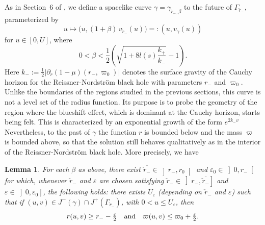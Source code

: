 \documentclass[a4paper,11pt,oneside,reqno]{amsart}
\newcommand{\kk}{k_+}
\newcommand{\kkk}{k_-}
\newtheorem{Lem}[Thm]{Lemma}
\newcommand{\eps}{\varepsilon}
\newcommand{\ckrm}{\check r_-}
\newcommand{\cg}{\Gamma}
\newcommand{\vgr}{v_{\ckrm}}
\newcommand{\gam}{\gamma}
\begin{document}
As in Section~6 of \cite{relIst2}, we define a spacelike curve $\gamma=\gamma_{\ckrm,\beta}$ to the future of
$\Gamma_{\ckrm}$, parameterized by
\begin{equation}\label{small_gamma}
u\mapsto\big(u,(1+\beta)\,\vgr(u))=:(u,v_\gamma(u))
\end{equation}
for $u\in[0,U]$, where
\begin{equation}\label{beta_ii} 
0<\beta<{\textstyle\frac 12\left(\sqrt{1+8l(s)\frac{\kk}{\kkk}}-1\right)}.
\end{equation}
Here $k_- := \frac12 \left|\partial_r(1-\mu)(r_-,\varpi_0)\right|$ denotes the surface gravity of the Cauchy horizon for the Reissner-Nordstr\"{o}m black hole with parameters $r_-$ and $\varpi_0$.
Unlike the boundaries of the regions studied in the previous sections, this curve is not a level set of the radius function. Its purpose is to probe the geometry of the region where the blueshift effect, which is dominant at the Cauchy horizon, starts being felt. This is characterized by an exponential growth of the form $e^{2k_- v}$
Nevertheless, to the past of $\gamma$ the function $r$ is bounded below and the mass $\varpi$ is bounded above, so that
the solution still behaves qualitatively as in the interior of the Reissner-Nordstr\"om black hole. More precisely, we have
\begin{Lem}\label{boot_r}
For each $\beta$ as above, there exist $\overline{\ckrm} \in \left]r_-, r_0\right[$ and $\eps_0\in\left]0,r_-\right[$ for which, whenever\/ $\ckrm$ and $\eps$ are chosen satisfying $\ckrm\in\left]r_-,\overline{\ckrm}\right]$ and $\eps\in\left]0,\eps_0\right]$, the following holds:
there exists $U_\eps$ (depending on $\ckrm$ and $\eps$) such that if $(u,v)\in J^-(\gam)\cap J^+(\cg_{\ckrm})$,
with $0<u\leq U_\eps$,
then 
\begin{equation}\label{r_omega_2}
r(u,v)\geq r_--{\textstyle\frac\eps 2}\quad{\rm and}\quad\varpi(u,v)\leq\varpi_0+{\textstyle\frac\eps 2}.
\end{equation}
\end{Lem}
\end{document}
